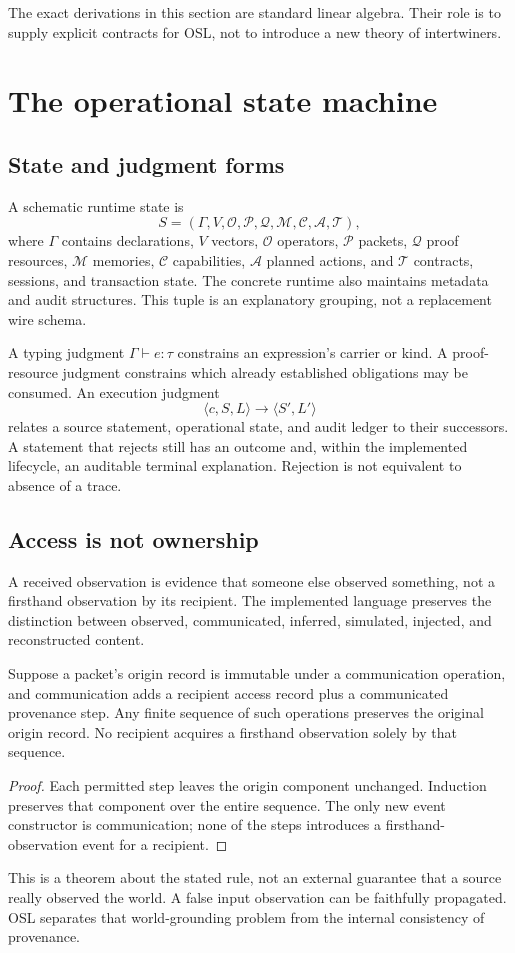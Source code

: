 \documentclass[11pt]{article}
\begin{document}
The exact derivations in this section are standard linear algebra. Their role is to supply explicit contracts for OSL, not to introduce a new theory of intertwiners.

\section{The operational state machine}
\subsection{State and judgment forms}
A schematic runtime state is
\[
 S=(\Gamma,V,\mathcal O,\mathcal P,\mathcal Q,\mathcal M,\mathcal C,\mathcal A,\mathcal T),
\]
where \(\Gamma\) contains declarations, \(V\) vectors, \(\mathcal O\) operators, \(\mathcal P\) packets, \(\mathcal Q\) proof resources, \(\mathcal M\) memories, \(\mathcal C\) capabilities, \(\mathcal A\) planned actions, and \(\mathcal T\) contracts, sessions, and transaction state. The concrete runtime also maintains metadata and audit structures. This tuple is an explanatory grouping, not a replacement wire schema.

A typing judgment \(\Gamma\vdash e:\tau\) constrains an expression's carrier or kind. A proof-resource judgment constrains which already established obligations may be consumed. An execution judgment
\[
 \langle c,S,L\rangle\longrightarrow\langle S',L'\rangle
\]
relates a source statement, operational state, and audit ledger to their successors. A statement that rejects still has an outcome and, within the implemented lifecycle, an auditable terminal explanation. Rejection is not equivalent to absence of a trace.

\subsection{Access is not ownership}
A received observation is evidence that someone else observed something, not a firsthand observation by its recipient. The implemented language preserves the distinction between observed, communicated, inferred, simulated, injected, and reconstructed content. \cite{o03,o05}

\begin{proposition}
Suppose a packet's origin record is immutable under a communication operation, and communication adds a recipient access record plus a communicated provenance step. Any finite sequence of such operations preserves the original origin record. No recipient acquires a firsthand observation solely by that sequence.
\end{proposition}
\begin{proof}
Each permitted step leaves the origin component unchanged. Induction preserves that component over the entire sequence. The only new event constructor is communication; none of the steps introduces a firsthand-observation event for a recipient.
\end{proof}
This is a theorem about the stated rule, not an external guarantee that a source really observed the world. A false input observation can be faithfully propagated. OSL separates that world-grounding problem from the internal consistency of provenance.
\end{document}
